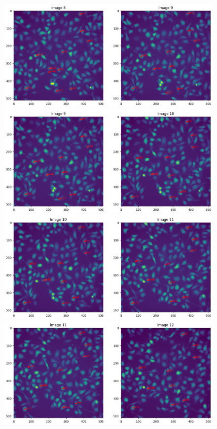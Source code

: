 \documentclass{article}
\begin{document}
\begin{figure}[h!]
\centering
\includegraphics[width=0.75\linewidth]{Report/RImages/Traces_Growth/trace-b9.png}
\includegraphics[width=0.75\linewidth]{Report/RImages/Traces_Growth/trace-b10.png}
\includegraphics[width=0.75\linewidth]{Report/RImages/Traces_Growth/trace-b11.png}
\includegraphics[width=0.75\linewidth]{Report/RImages/Traces_Growth/trace-b12.png}
\end{figure}

\clearpage
\end{document}
